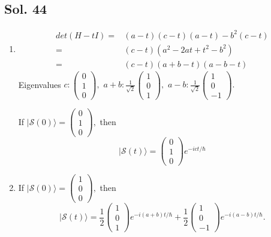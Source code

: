 \subsection*{Sol. 44}
\begin{enumerate}
    \item 
    \begin{align*}
        det(H-tI)=&
    (a-t)(c-t)(a-t) - b^2(c-t)\\
    =&(c-t)(a^2-2at+t^2-b^2)\\
    =&(c-t)(a+b-t)(a-b-t)
    \end{align*}
    Eigenvalues $c: 
    \begin{pmatrix}
    0\\1\\ 0
    \end{pmatrix},
    $
    $a+b: 
    \frac{1}{\sqrt{2}}\begin{pmatrix}
    1\\0\\ 1
    \end{pmatrix},
    $
    $a-b: 
    \frac{1}{\sqrt{2}}
    \begin{pmatrix}
    1\\0\\ -1
    \end{pmatrix}.
    $

    If $|\mathcal{S}(0)\rangle = \begin{pmatrix}
        0\\1\\0
    \end{pmatrix},$ then
    $$
    |\mathcal{S}(t)\rangle
    =
    \begin{pmatrix}
    0\\1\\ 0
    \end{pmatrix}e^{-ict/\hbar}
    $$
    \item 

     If $|\mathcal{S}(0)\rangle = \begin{pmatrix}
        1\\0\\0
    \end{pmatrix},$ then
    $$
    |\mathcal{S}(t)\rangle
    =
    \frac{1}{2}
    \begin{pmatrix}
    1\\0\\ 1
    \end{pmatrix}e^{-i(a+b)t/\hbar}
    +
    \frac{1}{2}
    \begin{pmatrix}
    1\\0\\ -1
    \end{pmatrix}e^{-i(a-b)t/\hbar}.
    $$
    
\end{enumerate}

